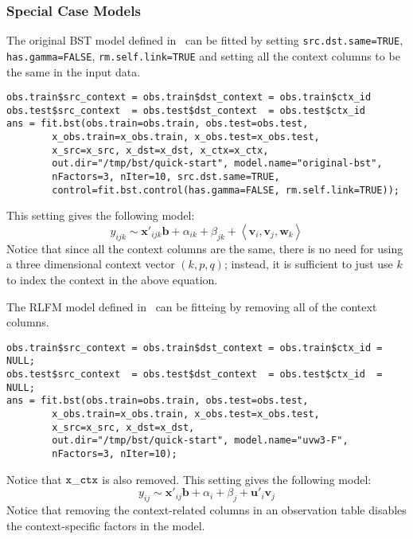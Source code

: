 \subsubsection{Special Case Models}

 The original BST model defined in~\cite{bst:kdd11} can be fitted by setting {\tt src.dst.same=TRUE}, {\tt has.gamma=FALSE}, {\tt rm.self.link=TRUE} and setting all the context columns to be the same in the input data.
{\small\begin{verbatim}
obs.train$src_context = obs.train$dst_context = obs.train$ctx_id
obs.test$src_context  = obs.test$dst_context  = obs.test$ctx_id
ans = fit.bst(obs.train=obs.train, obs.test=obs.test,
        x_obs.train=x_obs.train, x_obs.test=x_obs.test, 
        x_src=x_src, x_dst=x_dst, x_ctx=x_ctx,
        out.dir="/tmp/bst/quick-start", model.name="original-bst", 
        nFactors=3, nIter=10, src.dst.same=TRUE,
        control=fit.bst.control(has.gamma=FALSE, rm.self.link=TRUE));
\end{verbatim}}
\noindent This setting gives the following model:
$$
y_{ijk} \sim \bm{x}'_{ijk} \bm{b} + \alpha_{ik} + \beta_{jk} + \left<\bm{v}_i, \bm{v}_j, \bm{w}_k\right>
$$
Notice that since all the context columns are the same, there is no need for using a three dimensional context vector $(k,p,q)$; instead, it is sufficient to just use $k$ to index the context in the above equation.

The RLFM model defined in~\cite{rlfm:kdd09} can be fitteing by removing all of the context columns.
{\small\begin{verbatim}
obs.train$src_context = obs.train$dst_context = obs.train$ctx_id = NULL;
obs.test$src_context  = obs.test$dst_context  = obs.test$ctx_id  = NULL;
ans = fit.bst(obs.train=obs.train, obs.test=obs.test, 
        x_obs.train=x_obs.train, x_obs.test=x_obs.test, 
        x_src=x_src, x_dst=x_dst,
        out.dir="/tmp/bst/quick-start", model.name="uvw3-F", 
        nFactors=3, nIter=10);
\end{verbatim}}
\noindent Notice that ${\tt x\_ctx}$ is also removed.  This setting gives the following model:
$$
y_{ij} \sim \bm{x}'_{ij} \bm{b} + \alpha_{i} + \beta_{j} + \bm{u}'_i \bm{v}_j
$$
Notice that removing the context-related columns in an observation table disables the context-specific factors in the model.
